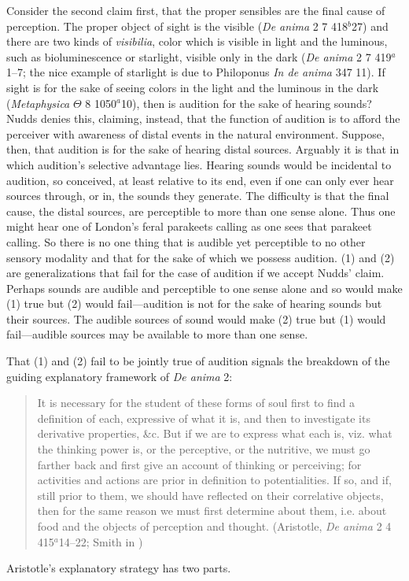 Consider the second claim first, that the proper sensibles are the final cause of perception. The proper object of sight is the visible (\emph{De anima} 2 7 418\( ^{b} \)27) and there are two kinds of \emph{visibilia}, color which is visible in light and the luminous, such as bioluminescence or starlight, visible only in the dark (\emph{De anima} 2 7 419\( ^{a} \)1--7; the nice example of starlight is due to Philoponus  \emph{In de anima} 347 11). If sight is for the sake of seeing colors in the light and the luminous in the dark (\emph{Metaphysica} \( \Theta \) 8 1050\( ^{a} \)10), then is audition for the sake of hearing sounds? Nudds denies this, claiming, instead, that the function of audition is to afford the perceiver with awareness of distal events in the natural environment. Suppose, then, that audition is for the sake of hearing distal sources. Arguably it is that in which audition's selective advantage lies. Hearing sounds would be incidental to audition, so conceived, at least relative to its end, even if one can only ever hear sources through, or in, the sounds they generate. The difficulty is that the final cause, the distal sources, are perceptible to more than one sense alone. Thus one might hear one of London's feral parakeets calling as one sees that parakeet calling. So there is no one thing that is audible yet perceptible to no other sensory modality and that for the sake of which we possess audition. (1) and (2) are generalizations that fail for the case of audition if we accept Nudds' claim. Perhaps sounds are audible and perceptible to one sense alone and so would make (1) true but (2) would fail---audition is not for the sake of hearing sounds but their sources. The audible sources of sound would make (2) true but (1) would fail---audible sources may be available to more than one sense.

That (1) and (2) fail to be jointly true of audition signals the breakdown of the guiding explanatory framework of \emph{De anima} 2:
\begin{quote}
	It is necessary for the student of these forms of soul first to find a definition of each, expressive of what it is, and then to investigate its derivative properties, \&c. But if we are to express what each is, viz. what the thinking power is, or the perceptive, or the nutritive, we must go farther back and first give an account of thinking or perceiving; for activities and actions are prior in definition to potentialities. If so, and if, still prior to them, we should have reflected on their correlative objects, then for the same reason we must first determine about them, i.e. about food and the objects of perception and thought. (Aristotle, \emph{De anima} 2 4 415\( ^{a} \)14--22; Smith in \citealt[26]{Barnes:1984uq})
\end{quote}
Aristotle's explanatory strategy has two parts. 

